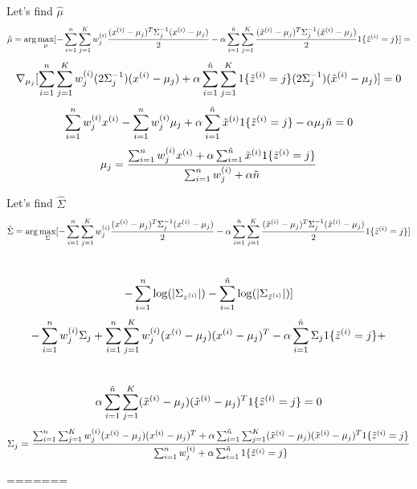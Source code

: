 \begin{answer}
Let's find $\hat{\mu}$
$$\hat{\mu} =  \arg\max_{\mu} [- \sum_{i=1}^{{n}} \sum_{j=1}^{K}  w_j^{(i)} \frac{(x^{(i)} - \mu_j)^T\Sigma_j^{-1}(x^{(i)} - \mu_j)}{2}  - \alpha \sum_{i=1}^{\tilde{{n}}} \sum_{j=1}^{K} \frac{(\tilde{x}^{(i)} - \mu_{j})^T\Sigma_{j}^{-1}(\tilde{x}^{(i)} - \mu_{j})}{2} 1\{\tilde{z}^{(i)}=j\}] = $$
$$\nabla_{\mu_j}[\sum_{i=1}^{{n}} \sum_{j=1}^{K} w_j^{(i)} (2\Sigma_j^{-1}) (x^{(i)} - \mu_j) +\alpha \sum_{i=1}^{\tilde{n}} \sum_{j=1}^{K}  1\{\tilde{z}^{(i)}=j\} (2\Sigma_j^{-1}) (\tilde{x}^{(i)} - \mu_j) ] = 0$$
$$\sum_{i=1}^{{n}} w_j^{(i)} x^{(i)} - \sum_{i=1}^{{n}}  w_j^{(i)} \mu_j +\alpha \sum_{i=1}^{\tilde{n}} \tilde{x}^{(i)} 1\{\tilde{z}^{(i)}=j\}-\alpha \mu_j \tilde{n} = 0$$
$$\mu_j = \frac{\sum_{i=1}^{{n}}  w_j^{(i)} x^{(i)} + \alpha \sum_{i=1}^{\tilde{n}} \tilde{x}^{(i)}1\{\tilde{z}^{(i)}=j\}}{\sum_{i=1}^{{n}} w_j^{(i)} + \alpha \tilde{n}}$$

Let's find $\hat{\Sigma}$
$$\hat{\Sigma} =  \arg\max_{\Sigma} [- \sum_{i=1}^{{n}} \sum_{j=1}^{K}  w_j^{(i)} \frac{(x^{(i)} - \mu_j)^T\Sigma_j^{-1}(x^{(i)} - \mu_j)}{2}  - \alpha \sum_{i=1}^{\tilde{{n}}} \sum_{j=1}^{K} \frac{(\tilde{x}^{(i)} - \mu_{j})^T\Sigma_{j}^{-1}(\tilde{x}^{(i)} - \mu_{j})}{2} 1\{\tilde{z}^{(i)}=j\}]$$ \\
$$ - \sum_{i=1}^{{n}} \log(|\Sigma_{z^{(i)}}|)  - \sum_{i=1}^{\tilde{{n}}} \log(|\Sigma_{\tilde{z}^{(i)}}|)]$$
$$-\sum_{i=1}^{{n}} w_j^{(i)} \Sigma_j + \sum_{i=1}^{{n}} \sum_{j=1}^{K}  w_j^{(i)} (x^{(i)} - \mu_j)(x^{(i)} - \mu_j)^T -  \alpha \sum_{i=1}^{\tilde{{n}}} \Sigma_j 1\{\tilde{z}^{(i)}= j\} +  $$ \\
$$\alpha \sum_{i=1}^{\tilde{{n}}} \sum_{j=1}^{K} (\tilde{x}^{(i)} - \mu_{j})(\tilde{x}^{(i)} - \mu_{j})^T 1\{\tilde{z}^{(i)}=j\}=0$$
$$\Sigma_j = \frac{ \sum_{i=1}^{{n}} \sum_{j=1}^{K}  w_j^{(i)} (x^{(i)} - \mu_j)(x^{(i)} - \mu_j)^T + \alpha \sum_{i=1}^{\tilde{{n}}} \sum_{j=1}^{K} (\tilde{x}^{(i)} - \mu_{j})(\tilde{x}^{(i)} - \mu_{j})^T 1\{\tilde{z}^{(i)}=j\}}{\sum_{i=1}^{{n}} w_j^{(i)} + \alpha \sum_{i=1}^{\tilde{{n}}} 1\{\tilde{z}^{(i)}= j\} }$$


\end{answer}
=======

